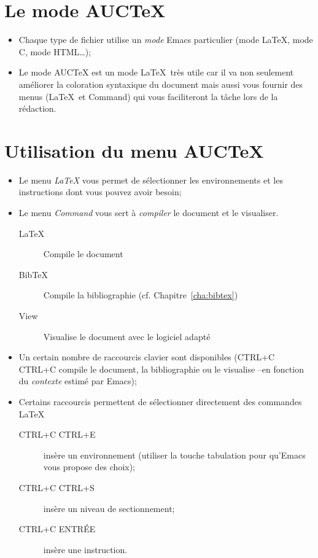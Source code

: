 \section{Le mode AUC\TeX}

\begin{itemize}
\item Chaque type de fichier utilise un \emph{mode} Emacs particulier
  (mode \LaTeX, mode C, mode HTML\ldots);
\item Le mode AUCTeX est un mode \LaTeX\ très utile car il va non
  seulement améliorer la coloration syntaxique du document mais aussi
  vous fournir des menus (\LaTeX\ et Command) qui vous faciliteront la
  tâche lors de la rédaction.
\end{itemize}



\section{Utilisation du menu AUC\TeX}

\begin{itemize}
\item Le menu \emph{\LaTeX} vous permet de sélectionner les
  environnements et les instructions dont vous pouvez avoir besoin;
\item Le menu \emph{Command} vous sert à \emph{compiler} le document
  et le visualiser.
  \begin{description}
  \item[LaTeX] Compile le document
  \item[BibTeX] Compile la bibliographie (cf. Chapitre~\ref{cha:bibtex})
  \item[View] Visualise le document avec le logiciel adapté
  \end{description}
\item Un certain nombre de raccourcis clavier sont disponibles (CTRL+C
  CTRL+C compile le document, la bibliographie ou le visualise --en
  fonction du \emph{contexte} estimé par Emacs);
\item Certains raccourcis permettent de sélectionner directement des commandes \LaTeX\
  \begin{description}
  \item[CTRL+C CTRL+E] insère un environnement (utiliser la touche
    tabulation pour qu'Emacs vous propose des choix);
  \item[CTRL+C CTRL+S] insère un niveau de sectionnement;
  \item[CTRL+C ENTR\'EE] insère une instruction.
  \end{description}
\end{itemize}


